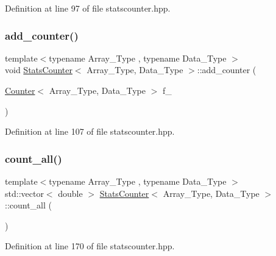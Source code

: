 Definition at line 97 of file statscounter.\+hpp.

\mbox{\label{class_stats_counter_ad175dcd2bd30d017881783de546ac333}} 
\subsubsection{\texorpdfstring{add\+\_\+counter()}{add\_counter()}\hspace{0.1cm}{\footnotesize\ttfamily [2/2]}}
{\footnotesize\ttfamily template$<$typename Array\+\_\+\+Type , typename Data\+\_\+\+Type $>$ \\
void \hyperlink{class_stats_counter}{Stats\+Counter}$<$ Array\+\_\+\+Type, Data\+\_\+\+Type $>$\+::add\+\_\+counter (\begin{DoxyParamCaption}\item[{\hyperlink{class_counter}{Counter}$<$ Array\+\_\+\+Type, Data\+\_\+\+Type $>$}]{f\+\_\+ }\end{DoxyParamCaption})\hspace{0.3cm}{\ttfamily [inline]}}



Definition at line 107 of file statscounter.\+hpp.

\mbox{\label{class_stats_counter_a83bd92031a1499109c98f238221cbd67}} 
\subsubsection{\texorpdfstring{count\+\_\+all()}{count\_all()}}
{\footnotesize\ttfamily template$<$typename Array\+\_\+\+Type , typename Data\+\_\+\+Type $>$ \\
std\+::vector$<$ double $>$ \hyperlink{class_stats_counter}{Stats\+Counter}$<$ Array\+\_\+\+Type, Data\+\_\+\+Type $>$\+::count\+\_\+all (\begin{DoxyParamCaption}{ }\end{DoxyParamCaption})\hspace{0.3cm}{\ttfamily [inline]}}



Definition at line 170 of file statscounter.\+hpp.

